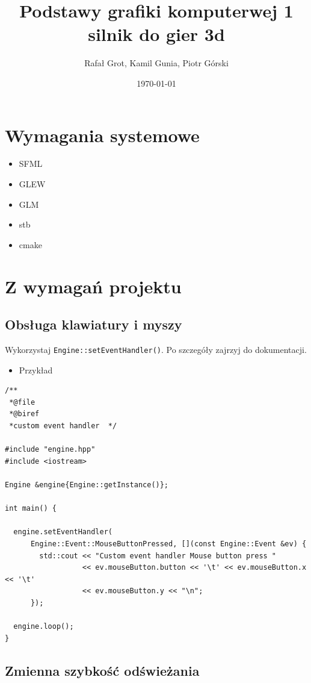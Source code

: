 \documentclass[11pt]{article}
\author{Rafał Grot, Kamil Gunia, Piotr Górski}
\date{\today}
\title{Podstawy grafiki komputerwej 1 silnik do gier 3d}
\begin{document}
\maketitle
\tableofcontents

\newpage
\section{Wymagania systemowe}
\label{sec:orge379287}
\begin{itemize}
\item SFML
\item GLEW
\item GLM
\item stb
\item cmake
\end{itemize}
\section{Z wymagań projektu}
\label{sec:orgf7514bb}

\subsection{Obsługa klawiatury i myszy}
\label{sec:orgeefe7e3}

Wykorzystaj \texttt{Engine::setEventHandler()}. Po szczegóły zajrzyj do dokumentacji.

\begin{itemize}
\item Przykład
\end{itemize}
\begin{verbatim}
/**
 *@file
 *@biref
 *custom event handler  */

#include "engine.hpp"
#include <iostream>

Engine &engine{Engine::getInstance()};

int main() {

  engine.setEventHandler(
      Engine::Event::MouseButtonPressed, [](const Engine::Event &ev) {
        std::cout << "Custom event handler Mouse button press "
                  << ev.mouseButton.button << '\t' << ev.mouseButton.x << '\t'
                  << ev.mouseButton.y << "\n";
      });

  engine.loop();
}
\end{verbatim}
\subsection{Zmienna szybkość odświeżania}
\label{sec:org890b744}
\end{document}
